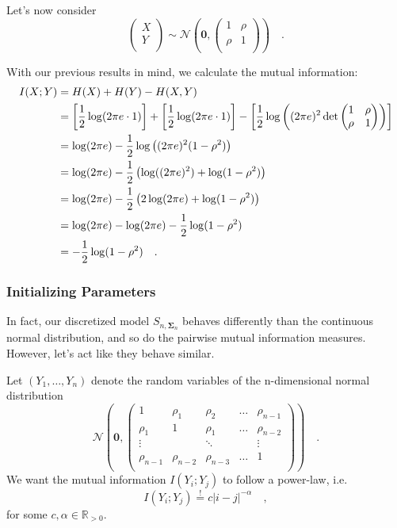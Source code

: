 \documentclass[../../main.tex]{subfiles}
\begin{document}
Let's now consider
\[
    \begin{pmatrix*}
        X \\
        Y \\
    \end{pmatrix*}
    \sim \mathcal{N}\left(\bm{0}, \begin{pmatrix*}
        1 & \rho \\
        \rho & 1 \\
    \end{pmatrix*}\right)
    \quad .
\]

With our previous results in mind, we calculate the mutual information:
\begin{align}
    I(X; Y) &= H(X) + H(Y) - H(X, Y) \notag \\
    &= \left[ \frac{1}{2} \log(2\pi e \cdot 1) \right] + \left[ \frac{1}{2} \log(2\pi e \cdot 1) \right] - \left[ \frac{1}{2} \log\left( (2\pi e)^2 \det\begin{pmatrix*} 1 & \rho \\ \rho & 1 \end{pmatrix*} \right) \right] \notag \\
    &= \log(2\pi e) - \frac{1}{2} \log\left( (2\pi e)^2 (1-\rho^2) \right) \notag \\
    &= \log(2\pi e) - \frac{1}{2} \left( \log((2\pi e)^2) + \log(1-\rho^2) \right) \notag \\
    &= \log(2\pi e) - \frac{1}{2} \left( 2\log(2\pi e) + \log(1-\rho^2) \right) \notag \\
    &= \log(2\pi e) - \log(2\pi e) - \frac{1}{2}\log(1-\rho^2) \notag \\
    &= -\frac{1}{2}\log(1-\rho^2) \label{eq:gauss_mutual_information} \quad .
\end{align}

\subsubsection{Initializing Parameters}
\label{sec:initializing_parameters}
In fact, our discretized model $S_{n, \bm{\Sigma}_n}$ behaves differently than the continuous normal distribution, and so do the pairwise mutual information measures. However, let's act like they behave similar.

Let $(Y_1, \dots, Y_n)$ denote the random variables of the n-dimensional normal distribution
\[
    \mathcal{N}\left(\bm{0}, \begin{pmatrix*}
        1& \rho_1& \rho_2& \dots & \rho_{n-1} \\
        \rho_1& 1& \rho_1& \dots & \rho_{n-2} \\
        \vdots &  & \ddots & & \vdots \\
        \rho_{n-1} & \rho_{n-2} & \rho_{n-3} & \dots & 1 \\
    \end{pmatrix*}\right) \quad .
\]
We want the mutual information $I(Y_i; Y_j)$ to follow a power-law, i.e.
\[
    I(Y_i; Y_j) \overset{!}{=} c |i-j|^{-\alpha} \quad ,
\]
for some $c, \alpha \in \mathbb{R}_{>0}$.
\end{document}
